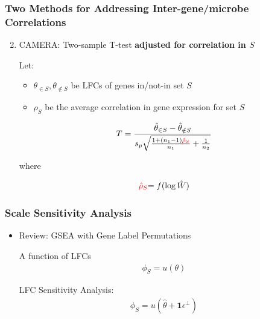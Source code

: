 \documentclass[11pt]{beamer}
\begin{document}
\begin{frame}
  \frametitle{Two Methods for Addressing Inter-gene/microbe Correlations}
  \begin{enumerate}

    \setcounter{enumi}{1}
    
  \item CAMERA: Two-sample T-test \textbf{adjusted for correlation in \(S\)}

    \vspace{15px}

    Let:
    \begin{itemize}
      \item \(\theta_{\in S}, \theta_{\notin S}\) be LFCs of genes in/not-in set \(S\)
      \item \(\rho_S\) be the average correlation in gene expression for set \(S\) 
    \end{itemize}
   
  \begin{align*}
    T = \frac{\hat{\theta}_{\in S} - \hat{\theta}_{\notin S}}{s_p\sqrt{\frac{1+(n_1-1)\color{red}{\hat{\rho}_S}}{n_1} + \frac{1}{n_2}}}
  \end{align*}

  where

  \begin{align*}
    \color{red}{\hat{\rho}_S}\color{black}{ = f(\log \hat{W})}
  \end{align*}
  
  \end{enumerate}
\end{frame}

\begin{frame}
  \frametitle{Scale Sensitivity Analysis}

  \begin{itemize}
  \item Review: GSEA with Gene Label Permutations

    \vspace{10px}
    A function of LFCs
    \begin{align*}
      \phi_S = u(\theta)
    \end{align*}

    \vspace{10px}
    LFC Sensitivity Analysis:
    \begin{align*}
      \phi_S = u(\hat{\theta} + \pmb{1}\epsilon^\perp)
    \end{align*}
  \end{itemize}
  
\end{frame}
\end{document}
